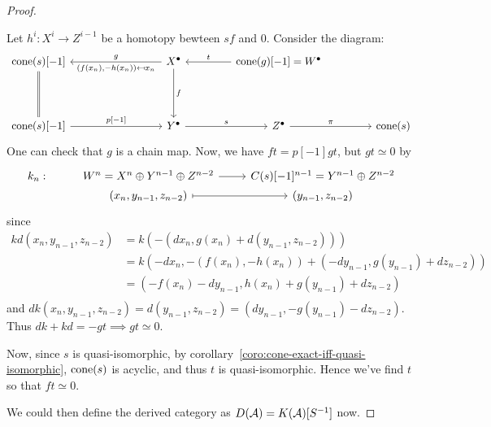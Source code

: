 \begin{theorem}
\begin{proof}
\begin{enumerate}
        Let $h^i : X^i \to Z^{i-1}$ be a homotopy bewteen $sf$ and $0$.
        Consider the diagram:
        \[ \begin{tikzcd}[column sep=1.5cm, row sep=1.5cm]
            \cone(s)[-1] \ar[rr, leftarrow, "g", "{(f(x_n), -h(x_n)) \mapsfrom x_n}"']
            \ar[d, equal] & &
            X^\bullet \ar[r, leftarrow, "t"] \ar[d, "f"] &
            \cone(g)[-1] = W^\bullet & \\
            \cone(s)[-1] \ar[rr, "{p[-1]}"] & &
            Y^\bullet \ar[r, "s"] &
            Z^\bullet \ar[r, "\pi"] &
            \cone(s)
          \end{tikzcd} \]
        One can check that $g$ is a chain map. Now, we have $ft = p[-1]gt$,
        but $gt \simeq 0$ by
        \[ \begin{tikzcd}[row sep=0]
            k_n: & W^n = X^n \oplus Y^{n-1} \oplus Z^{n-2} \ar[r]
            & C(s)[-1]^{n-1} = Y^{n-1} \oplus Z^{n-2} \\
            & (x_n, y_{n-1}, z_{n-2}) \ar[r, mapsto] & (y_{n-1}, z_{n-2})
          \end{tikzcd} \]
        since
        \begin{align*}
          k d (x_n, y_{n-1}, z_{n-2})
          &= k ( -(dx_n, g(x_n) + d(y_{n-1}, z_{n-2}))) \\
          &= k (- dx_n, - (f(x_n), -h(x_n)) + (-d y_{n-1}, g(y_{n-1}) + d z_{n-2})) \\
          &= (-f(x_n) - dy_{n-1}, h(x_n) + g(y_{n-1}) + d z_{n-2}) \\
        \end{align*}
        and $dk(x_n, y_{n-1}, z_{n-2}) = d(y_{n-1}, z_{n-2}) = (d y_{n-1}, -g(y_{n-1}) - d z_{n-2})$.
        Thus $dk + kd = -gt \implies gt \simeq 0$.

        Now, since $s$ is quasi-isomorphic, by corollary~\ref{coro:cone-exact-iff-quasi-isomorphic},
        $\operatorname{cone}(s)$ is acyclic, and thus $t$ is quasi-isomorphic.
        Hence we've find $t$ so that $ft \simeq 0$.
    \end{enumerate}
    We could then define the derived category as $D(\mathcal{A}) = K(\mathcal{A})[S^{-1}]$ now.
  \end{proof}
\end{theorem}

